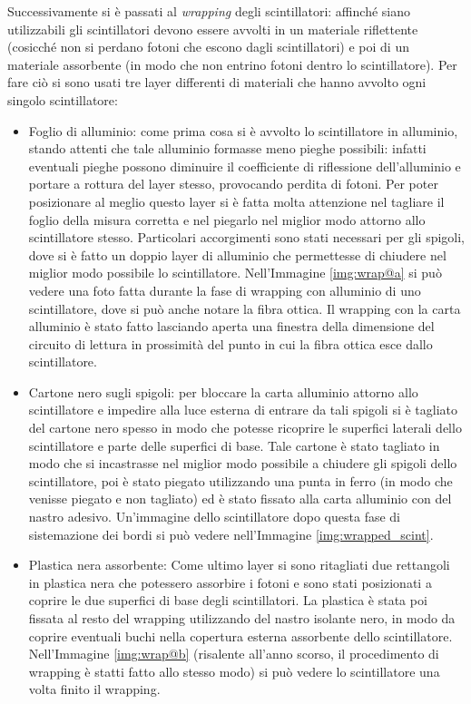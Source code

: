 Successivamente si è passati al \textit{wrapping} degli scintillatori: affinché siano utilizzabili gli scintillatori devono essere avvolti in un materiale riflettente
(cosicch\'e non si perdano fotoni che escono dagli scintillatori) e poi di un materiale assorbente (in modo che non entrino fotoni dentro lo scintillatore). Per fare
ciò si sono usati tre layer differenti di materiali che hanno avvolto ogni singolo scintillatore:
\begin{itemize}
\item Foglio di alluminio: come prima cosa si è avvolto lo scintillatore in alluminio, stando attenti che tale alluminio formasse meno pieghe possibili: infatti eventuali pieghe
possono diminuire il coefficiente di riflessione dell'alluminio e portare a rottura del layer stesso, provocando perdita di fotoni. Per poter posizionare al meglio
questo layer si è fatta molta attenzione nel tagliare il foglio della misura corretta e nel piegarlo nel miglior  modo attorno allo scintillatore stesso. Particolari
accorgimenti sono stati necessari per gli spigoli, dove si è fatto un doppio layer di alluminio che permettesse di chiudere nel miglior modo possibile lo
scintillatore. Nell'Immagine \ref{img:wrap@a} si può vedere una foto fatta durante la fase di wrapping con alluminio di uno scintillatore, dove si può anche notare la fibra
ottica. Il wrapping con la carta alluminio è stato fatto lasciando aperta una finestra della dimensione del circuito di lettura in prossimità del punto in cui la fibra
ottica esce dallo scintillatore.\\


\item Cartone nero sugli spigoli: per bloccare la carta alluminio attorno allo scintillatore e impedire alla luce esterna di entrare da tali spigoli si è tagliato del cartone
nero spesso in modo che potesse ricoprire le superfici laterali dello scintillatore e parte delle superfici di base. Tale cartone è stato tagliato in modo che si incastrasse
nel miglior modo possibile a chiudere gli spigoli dello scintillatore, poi è stato piegato utilizzando una punta in ferro (in modo che venisse piegato
e non tagliato) ed è stato fissato alla carta alluminio con del nastro adesivo. Un'immagine dello scintillatore dopo questa fase di sistemazione dei bordi si può vedere
nell'Immagine \ref{img:wrapped_scint}.


\item Plastica nera assorbente: Come ultimo layer si sono ritagliati due rettangoli in plastica nera che potessero assorbire i fotoni e sono stati posizionati a coprire
le due superfici di base degli scintillatori. La plastica è stata poi fissata al resto del wrapping utilizzando del nastro isolante nero, in modo da coprire eventuali buchi
nella copertura esterna assorbente dello scintillatore. Nell'Immagine \ref{img:wrap@b} (risalente all'anno scorso, il procedimento di wrapping è statti fatto
allo stesso modo) si può vedere lo scintillatore una volta finito il wrapping.


\end{itemize}
